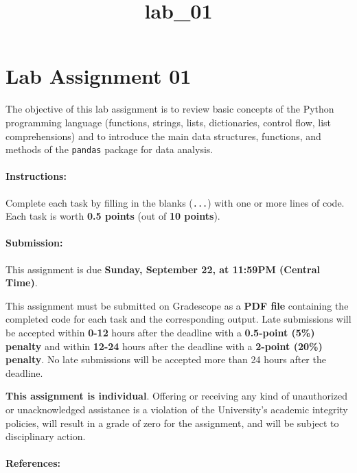\documentclass[11pt]{article}
\title{lab\_01}
\begin{document}
    
    
    \maketitle
    
    

    
    \section{Lab Assignment 01}\label{lab-assignment-01}

The objective of this lab assignment is to review basic concepts of the
Python programming language (functions, strings, lists, dictionaries,
control flow, list comprehensions) and to introduce the main data
structures, functions, and methods of the \texttt{pandas} package for
data analysis.

\paragraph{Instructions:}\label{instructions}

Complete each task by filling in the blanks (\texttt{...}) with one or
more lines of code. Each task is worth \textbf{0.5 points} (out of
\textbf{10 points}).

\paragraph{Submission:}\label{submission}

This assignment is due \textbf{Sunday, September 22, at 11:59PM (Central
Time)}.

This assignment must be submitted on Gradescope as a \textbf{PDF file}
containing the completed code for each task and the corresponding
output. Late submissions will be accepted within \textbf{0-12} hours
after the deadline with a \textbf{0.5-point (5\%) penalty} and within
\textbf{12-24} hours after the deadline with a \textbf{2-point (20\%)
penalty}. No late submissions will be accepted more than 24 hours after
the deadline.

\textbf{This assignment is individual}. Offering or receiving any kind
of unauthorized or unacknowledged assistance is a violation of the
University's academic integrity policies, will result in a grade of zero
for the assignment, and will be subject to disciplinary action.

\paragraph{References:}\label{references}
\end{document}
